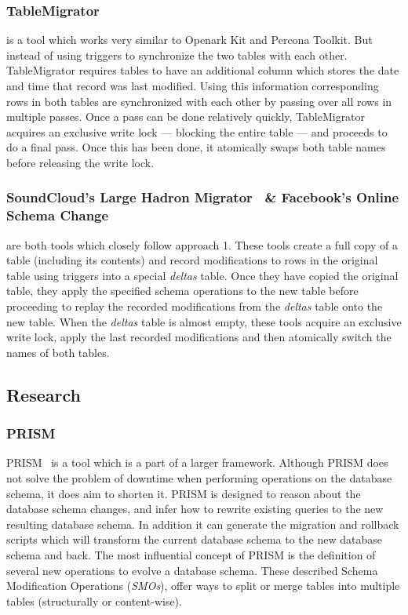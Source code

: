 \documentclass[conference]{IEEEtran}
\begin{document}
\subsubsection{TableMigrator~\cite{TableMigrator}}
is a tool which works very similar to Openark Kit and Percona Toolkit. But instead of using triggers to synchronize the two tables with each other. TableMigrator requires tables to have an additional column which stores the date and time that record was last modified. Using this information corresponding rows in both tables are synchronized with each other by passing over all rows in multiple passes. Once a pass can be done relatively quickly, TableMigrator acquires an exclusive write lock --- blocking the entire table --- and proceeds to do a final pass. Once this has been done, it atomically swaps both table names before releasing the write lock.

\subsubsection{SoundCloud's Large Hadron Migrator~\cite{SoundcloudLHM} \& Facebook's Online Schema Change~\cite{FacebookOSC}}
are both tools which closely follow approach 1. These tools create a full copy of a table (including its contents) and record modifications to rows in the original table using triggers into a special \textit{deltas} table. Once they have copied the original table, they apply the specified schema operations to the new table before proceeding to replay the recorded modifications from the \textit{deltas} table onto the new table. When the \textit{deltas} table is almost empty, these tools acquire an exclusive write lock, apply the last recorded modifications and then atomically switch the names of both tables.

\subsection{Research}

\subsubsection{PRISM}
PRISM~\cite{Curino:2010:URI:1921071.1921078, Curino:2009:ADS:1656437.1656444} is a tool which is a part of a larger framework. Although PRISM does not solve the problem of downtime when performing operations on the database schema, it does aim to shorten it. PRISM is designed to reason about the database schema changes, and infer how to rewrite existing queries to the new resulting database schema. In addition it can generate the migration and rollback scripts which will transform the current database schema to the new database schema and back. The most influential concept of PRISM is the definition of several new operations to evolve a database schema. These described Schema Modification Operations (\textit{SMOs}), offer ways to split or merge tables into multiple tables (structurally or content-wise).
\end{document}
